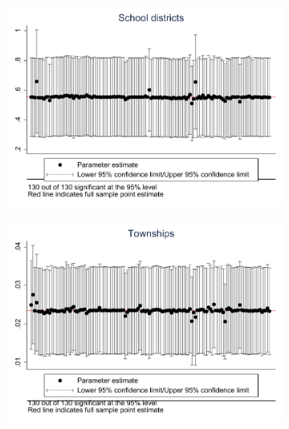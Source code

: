 \documentclass{article}
\begin{document}
\begin{landscape}
\begin{figure}[htbp]
\begin{subfigure}{0.4\textwidth}
        \includegraphics[width=\linewidth]{figures/exogeneity_tests/loo_iv_schdist_ind_new_ctrls.pdf}
        \label{fig:sub3}
    \end{subfigure}
    \begin{subfigure}{0.4\textwidth}
        \includegraphics[width=\linewidth]{figures/exogeneity_tests/loo_iv_gen_town_new_ctrls.pdf}
        \label{fig:sub4}
    \end{subfigure}
    \begin{subfigure}{0.4\textwidth}

\end{subfigure}
\end{figure}
\end{landscape}
\end{document}
